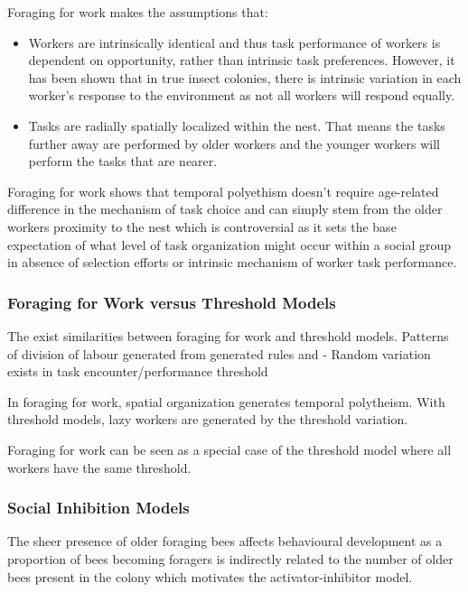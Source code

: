 Foraging for work makes the assumptions that:
\begin{itemize}
	\item Workers are intrinsically identical and thus task performance of workers is dependent on opportunity, rather than intrinsic task preferences. However, it has been shown that in true insect colonies, there is intrinsic variation in each worker's response to the environment as not all workers will respond equally. 
	\item Tasks are radially spatially localized within the nest. That means the tasks further away are performed by older workers and the younger workers will perform the tasks that are nearer.
\end{itemize}

Foraging for work shows that temporal polyethism doesn't require age-related difference in the mechanism of task choice and can simply stem from the older workers proximity to the nest which is controversial as it sets the base expectation of what level of task organization might occur within a social group in absence of selection efforts or intrinsic mechanism of worker task performance.

\subsubsection{Foraging for Work versus Threshold Models} %
The exist similarities between foraging for work and threshold models. Patterns of division of labour generated from generated rules and 
- Random variation exists in task encounter/performance threshold

In foraging for work, spatial organization generates temporal polytheism. 
With threshold models, lazy workers are generated by the threshold variation. 

Foraging for work can be seen as a special case of the threshold model where all workers have the same threshold. %

\subsubsection{Social Inhibition Models}

The sheer presence of older foraging bees affects behavioural development as a proportion of bees becoming foragers is indirectly related to the number of older bees present in the colony  which motivates the activator-inhibitor model.

